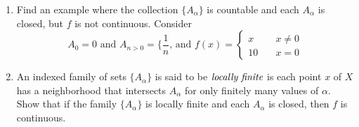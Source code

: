 \documentclass[12pt,letterpaper]{article}
\newcommand{\n}{\break}
\begin{document}
\begin{enumerate}
\begin{enumerate}
    \item Find an example where the collection $\{A_\alpha\}$ is countable and each $A_\alpha$ is closed, but $f$ is not continuous.\hspace{5in}\n
    \indent Consider 
    $$A_0={0} \text{ and } A_{n>0}=\{\frac{1}{n}\text{, and } f(x)=\begin{cases} x & \quad x\neq 0 \\ 10 & \quad x=0\end{cases}$$
    \item An indexed family of sets $\{A_\alpha\}$ is said to be $\emph{locally finite}$ is each point $x$ of $X$ has a neighborhood that intersects $A_\alpha$ for only finitely many values of $\alpha$. Show that if the family $\{A_\alpha\}$ is locally finite and each $A_\alpha$ is closed, then $f$ is continuous.
  \end{enumerate}
\end{enumerate}
\end{document}
